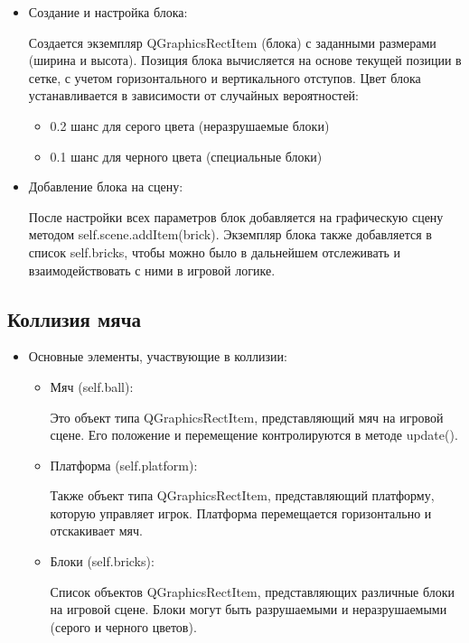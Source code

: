 \begin{itemize}
    \item Создание и настройка блока:
    
        Создается экземпляр QGraphicsRectItem (блока) с заданными размерами (ширина и высота). Позиция блока вычисляется на основе текущей позиции в сетке, с учетом горизонтального и вертикального отступов. 
        Цвет блока устанавливается в зависимости от случайных вероятностей:
        \begin{itemize}
            \item 0.2 шанс для серого цвета (неразрушаемые блоки)
            \item 0.1 шанс для черного цвета (специальные блоки)
        \end{itemize}
\end{itemize}
\begin{itemize}
    \item Добавление блока на сцену:
    
        После настройки всех параметров блок добавляется на графическую сцену методом self.scene.addItem(brick).
        Экземпляр блока также добавляется в список self.bricks, чтобы можно было в дальнейшем отслеживать и взаимодействовать с ними в игровой логике.
\end{itemize}

\subsection{\label{subsec:ch02/sec02/sub04}Коллизия мяча}
\begin{itemize}
 \item Основные элементы, участвующие в коллизии:
\begin{itemize}
    \item Мяч (self.ball):
    
        Это объект типа QGraphicsRectItem, представляющий мяч на игровой сцене. Его положение и перемещение контролируются в методе update().

    \item Платформа (self.platform):
    
        Также объект типа QGraphicsRectItem, представляющий платформу, которую управляет игрок. Платформа перемещается горизонтально и отскакивает мяч.

    \item Блоки (self.bricks):
    
        Список объектов QGraphicsRectItem, представляющих различные блоки на игровой сцене. Блоки могут быть разрушаемыми и неразрушаемыми (серого и черного цветов).
\end{itemize}
\end{itemize}


